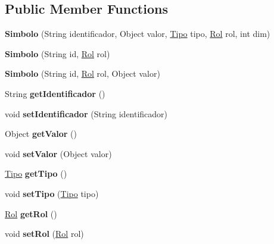\subsection*{Public Member Functions}
\begin{DoxyCompactItemize}
\item 
\mbox{\label{classentorno_1_1_simbolo_ad95d1f480f166dd64e878a9779828cd6}} 
{\bfseries Simbolo} (String identificador, Object valor, \mbox{\hyperlink{classentorno_1_1_tipo}{Tipo}} tipo, \mbox{\hyperlink{enumentorno_1_1_simbolo_1_1_rol}{Rol}} rol, int dim)
\item 
\mbox{\label{classentorno_1_1_simbolo_aed7f5e07a79ac062383fe1876abce7b6}} 
{\bfseries Simbolo} (String id, \mbox{\hyperlink{enumentorno_1_1_simbolo_1_1_rol}{Rol}} rol)
\item 
\mbox{\label{classentorno_1_1_simbolo_a5501bd67507a8372fd97e1e6d5c0ac20}} 
{\bfseries Simbolo} (String id, \mbox{\hyperlink{enumentorno_1_1_simbolo_1_1_rol}{Rol}} rol, Object valor)
\item 
\mbox{\label{classentorno_1_1_simbolo_a4960314d68f6ef105fdfcf3489812227}} 
String {\bfseries get\+Identificador} ()
\item 
\mbox{\label{classentorno_1_1_simbolo_a31e199ddb428936fbf33e25d6e69e3d5}} 
void {\bfseries set\+Identificador} (String identificador)
\item 
\mbox{\label{classentorno_1_1_simbolo_a129b6aec61c7bfcecb84fffa721846be}} 
Object {\bfseries get\+Valor} ()
\item 
\mbox{\label{classentorno_1_1_simbolo_a1df1e0af8018c9d58702c1c6c4cc5325}} 
void {\bfseries set\+Valor} (Object valor)
\item 
\mbox{\label{classentorno_1_1_simbolo_a852e60225ce617f81537f77cc6bf7eb4}} 
\mbox{\hyperlink{classentorno_1_1_tipo}{Tipo}} {\bfseries get\+Tipo} ()
\item 
\mbox{\label{classentorno_1_1_simbolo_ad3df2118aa22e27caa80896fd27f9862}} 
void {\bfseries set\+Tipo} (\mbox{\hyperlink{classentorno_1_1_tipo}{Tipo}} tipo)
\item 
\mbox{\label{classentorno_1_1_simbolo_a939cdbdf8d27e795ad2eb4697c8f3e5e}} 
\mbox{\hyperlink{enumentorno_1_1_simbolo_1_1_rol}{Rol}} {\bfseries get\+Rol} ()
\item 
\mbox{\label{classentorno_1_1_simbolo_a52c0e3d4026fd78e28f0deab6062142c}} 
void {\bfseries set\+Rol} (\mbox{\hyperlink{enumentorno_1_1_simbolo_1_1_rol}{Rol}} rol)
\end{DoxyCompactItemize}
